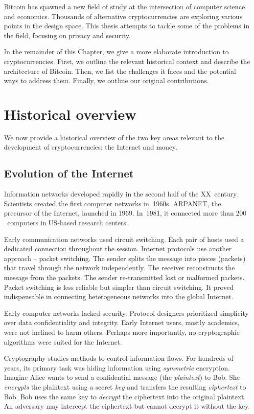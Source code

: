 Bitcoin has spawned a new field of study at the intersection of computer science and economics.
Thousands of alternative cryptocurrencies are exploring various points in the design space.
This thesis attempts to tackle some of the problems in the field, focusing on privacy and security.

In the remainder of this Chapter, we give a more elaborate introduction to cryptocurrencies.
First, we outline the relevant historical context and describe the architecture of Bitcoin.
Then, we list the challenges it faces and the potential ways to address them.
Finally, we outline our original contributions.


\section{Historical overview}

We now provide a historical overview of the two key areas relevant to the development of cryptocurrencies: the Internet and money.

\subsection{Evolution of the Internet}

Information networks developed rapidly in the second half of the XX~century.
Scientists created the first computer networks in~1960s.
ARPANET, the precursor of the Internet, launched in 1969.
In~1981, it connected more than $200$~computers in US-based research centers.

Early communication networks used circuit switching.
Each pair of hosts used a dedicated connection throughout the session.
Internet protocols use another approach -- packet switching.
The sender splits the message into pieces (packets) that travel through the network independently.
The receiver reconstructs the message from the packets.
The sender re-transmitted lost or malformed packets.
Packet switching is less reliable but simpler than circuit switching.
It proved indispensable in connecting heterogeneous networks into the global Internet.

Early computer networks lacked security.
Protocol designers prioritized simplicity over data confidentiality and integrity.
Early Internet users, mostly academics, were not inclined to harm others.
Perhaps more importantly, no cryptographic algorithms were suited for the Internet.

Cryptography studies methods to control information flows.
For hundreds of years, its primary task was hiding information using \textit{symmetric} encryption.
Imagine Alice wants to send a confidential message (the \textit{plaintext}) to Bob.
She \textit{encrypts} the plaintext using a secret \textit{key} and transfers the resulting \textit{ciphertext} to Bob.
Bob uses the same key to \textit{decrypt} the ciphertext into the original plaintext.
An adversary may intercept the ciphertext but cannot decrypt it without the key.

